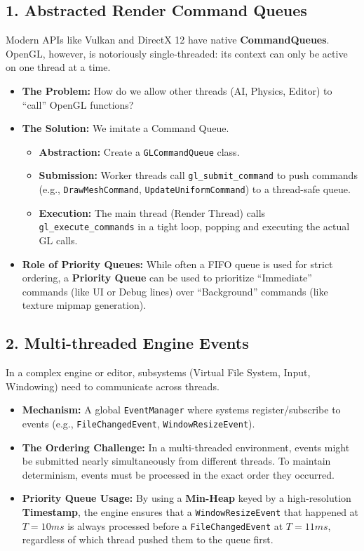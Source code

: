 \documentclass[11pt]{article}
\begin{document}
\subsection{1. Abstracted Render Command Queues}
\label{sec:org9d42f80}
Modern APIs like Vulkan and DirectX 12 have native \textbf{CommandQueues}. OpenGL, however, is notoriously single-threaded: its context can only be active on one thread at a time.
\begin{itemize}
\item \textbf{The Problem:} How do we allow other threads (AI, Physics, Editor) to ``call'' OpenGL functions?
\item \textbf{The Solution:} We imitate a Command Queue.
\begin{itemize}
\item \textbf{Abstraction:} Create a \texttt{GLCommandQueue} class.
\item \textbf{Submission:} Worker threads call \texttt{gl\_submit\_command} to push commands (e.g., \texttt{DrawMeshCommand}, \texttt{UpdateUniformCommand}) to a thread-safe queue.
\item \textbf{Execution:} The main thread (Render Thread) calls \texttt{gl\_execute\_commands} in a tight loop, popping and executing the actual GL calls.
\end{itemize}
\item \textbf{Role of Priority Queues:} While often a FIFO queue is used for strict ordering, a \textbf{Priority Queue} can be used to prioritize ``Immediate'' commands (like UI or Debug lines) over ``Background'' commands (like texture mipmap generation).

\newpage
\end{itemize}
\subsection{2. Multi-threaded Engine Events}
\label{sec:orgfb77537}
In a complex engine or editor, subsystems (Virtual File System, Input, Windowing) need to communicate across threads.
\begin{itemize}
\item \textbf{Mechanism:} A global \texttt{EventManager} where systems register/subscribe to events (e.g., \texttt{FileChangedEvent}, \texttt{WindowResizeEvent}).
\item \textbf{The Ordering Challenge:} In a multi-threaded environment, events might be submitted nearly simultaneously from different threads. To maintain determinism, events must be processed in the exact order they occurred.
\item \textbf{Priority Queue Usage:} By using a \textbf{Min-Heap} keyed by a high-resolution \textbf{Timestamp}, the engine ensures that a \texttt{WindowResizeEvent} that happened at \(T=10ms\) is always processed before a \texttt{FileChangedEvent} at \(T=11ms\), regardless of which thread pushed them to the queue first.

\newpage
\end{itemize}
\end{document}
